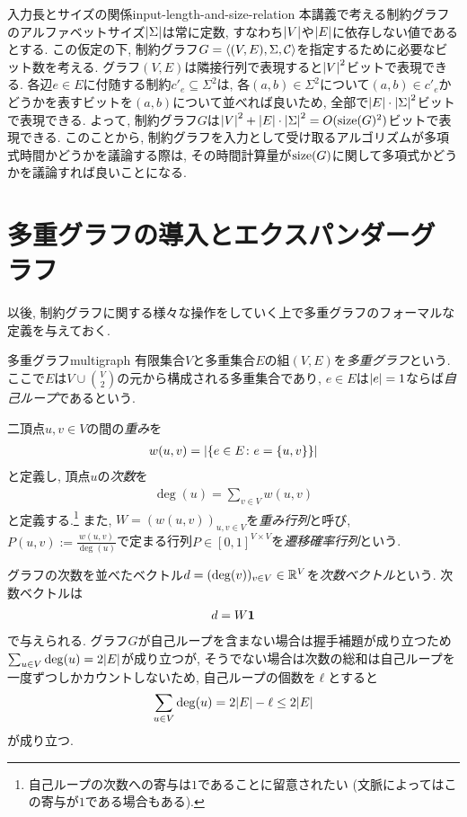 \begin{remark}{入力長とサイズの関係}{input-length-and-size-relation}
  本講義で考える制約グラフのアルファベットサイズ$\abs{\Sigma}$は常に定数, すなわち$\abs{V}$や$\abs{E}$に依存しない値であるとする.
  この仮定の下, 制約グラフ$G=\langle(V,E),\Sigma,\mathcal{C}\rangle$を指定するために必要なビット数を考える.
  グラフ$(V,E)$は隣接行列で表現すると$\abs{V}^2$ビットで表現できる.
  各辺$e\in E$に付随する制約$c'_e\subseteq\Sigma^2$は, 各$(a,b)\in\Sigma^2$について$(a,b)\in c'_e$かどうかを表すビットを$(a,b)$について並べれば良いため, 全部で$\abs{E}\cdot\abs{\Sigma}^2$ビットで表現できる.
  よって, 制約グラフ$G$は$\abs{V}^2+\abs{E}\cdot\abs{\Sigma}^2 = O(\mathrm{size}(G)^2)$ビットで表現できる.
  このことから, 制約グラフを入力として受け取るアルゴリズムが多項式時間かどうかを議論する際は, その時間計算量が$\mathrm{size}(G)$に関して多項式かどうかを議論すれば良いことになる.
\end{remark}

\section{多重グラフの導入とエクスパンダーグラフ}

以後, 制約グラフに関する様々な操作をしていく上で多重グラフのフォーマルな定義を与えておく.

\begin{definition}{多重グラフ}{multigraph}
有限集合$V$と多重集合$E$の組$(V,E)$を\emph{多重グラフ}という.
ここで$E$は$V\cup \binom{V}{2}$の元から構成される多重集合であり, $e\in E$は$\abs{e}=1$ならば\emph{自己ループ}であるという.

二頂点$u,v\in V$の間の\emph{重み}を
\begin{align*}
  w(u,v) = \abs{\qty{e\in E \colon e = \{u,v\}}}
\end{align*}
と定義し, 頂点$u$の\emph{次数}を
\begin{align*}
  \deg(u) = \sum_{v\in V} w(u,v)
\end{align*}
と定義する.\footnote{自己ループの次数への寄与は$1$であることに留意されたい (文脈によってはこの寄与が$1$である場合もある).} また, $W=(w(u,v))_{u,v\in V}$を\emph{重み行列}と呼び, 
$P(u,v):=\frac{w(u,v)}{\deg(u)}$で定まる行列$P\in[0,1]^{V\times V}$を\emph{遷移確率行列}という.

\end{definition}

グラフの次数を並べたベクトル$d=(\deg(v))_{v\in V}\in \mathbb{R}^V$を\emph{次数ベクトル}という.
次数ベクトルは
\begin{align*}
  d = W\mathbf{1}
\end{align*}
で与えられる.
グラフ$G$が自己ループを含まない場合は握手補題が成り立つため$\sum_{u\in V}\deg(u) = 2\abs{E}$が成り立つが, そうでない場合は次数の総和は自己ループを一度ずつしかカウントしないため, 自己ループの個数を$\ell$とすると
\begin{align}
  \sum_{u\in V} \deg(u) = 2\abs{E} - \ell \le 2\abs{E} \label{eq:hand_shake_multigraph}
\end{align}
が成り立つ.


